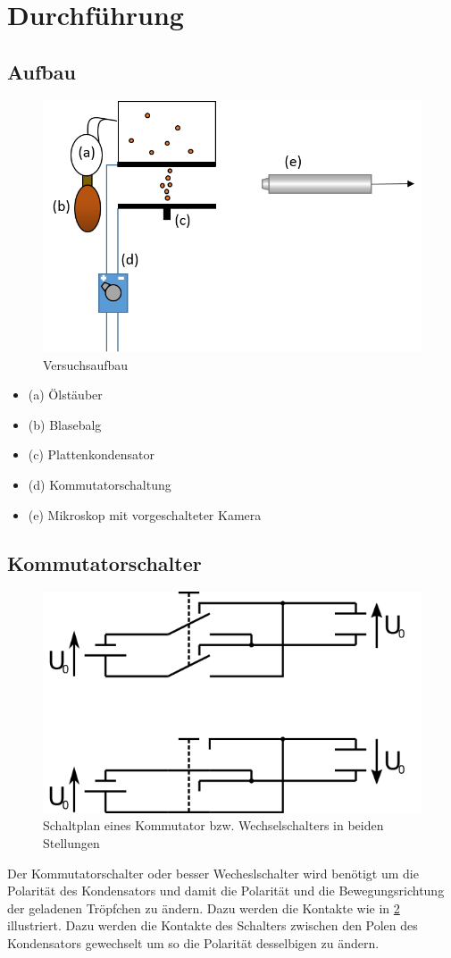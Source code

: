 \documentclass{scrartcl}
\begin{document}
            \section{Durchführung}
	\subsection{Aufbau}
		\begin{figure}[H]
			\centering
			\includegraphics[width=1.0\textwidth]{Versuchsaufbau2.PNG}
			\caption{Versuchsaufbau}
			\label{versuchsaufbau}
		\end{figure}
		\begin{itemize}
			\item (a) Ölstäuber
			\item (b) Blasebalg 
			\item (c) Plattenkondensator
			\item (d) Kommutatorschaltung
			\item (e) Mikroskop mit vorgeschalteter Kamera
		\end{itemize}
	\subsection{Kommutatorschalter}
		\begin{figure}[H]
			\centering
			\includegraphics[width=.5\textwidth]{kommutator.png} 
			\caption{Schaltplan eines Kommutator bzw. Wechselschalters in beiden Stellungen}
			\label{kommutator} 
		\end{figure}
		Der Kommutatorschalter oder besser Wecheslschalter wird benötigt um die Polarität des Kondensators und damit die Polarität
		und die Bewegungsrichtung der geladenen Tröpfchen zu ändern. Dazu werden die Kontakte wie in \ref{kommutator} illustriert.
		Dazu werden die Kontakte des Schalters zwischen den Polen des Kondensators gewechselt um so die Polarität desselbigen zu ändern.
\end{document}
